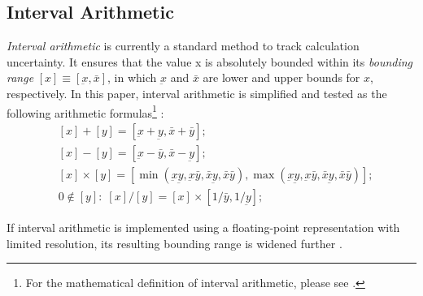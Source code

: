 \documentclass[twoside]{article}
\numberwithin{equation}{section}
\begin{document}
\subsection{Interval Arithmetic \cite{Prev_Precision_Arithmetic}}

\emph{Interval arithmetic} \cite{Precise_Numerical_Methods}\cite{Interval_Analysis}\cite{Worst_Case_Error_Bounds}\cite{Interval_Analysis_Theory_Applications}\cite{Interval_Arithmetic}\cite{Interval_Analysis_Notations} is currently a standard method to track calculation uncertainty.  
It ensures that the value x is absolutely bounded within its \emph{bounding range} $[x] \equiv [\underbar{x}, \bar{x}]$, in which $\underbar{x}$ and $\bar{x}$ are lower and upper bounds for $x$, respectively. 
In this paper, interval arithmetic is simplified and tested as the following arithmetic formulas\footnote{For the mathematical definition of interval arithmetic, please see \cite{Interval_Analysis_Notations}.} \cite{Interval_Analysis_Theory_Applications}:
\begin{align}
\label{eqn: interval +} & 
\left[x\right] + \left[y\right] = \left[\underbar{x} + \underbar{y}, \bar{x} + \bar{y}\right]; \\
\label{eqn: interval -} & 
\left[x\right] - \left[y\right] = \left[\underbar{x} - \bar{y}, \bar{x} - \underbar{y}\right]; \\
\label{eqn: interval *} &
\left[x\right] \times \left[y\right] = \left[\min(\underbar{x}  \underbar{y}, \underbar{x}  \bar{y}, \bar{x}  \underbar{y}, \bar{x}  \bar{y}), \max(\underbar{x}  \underbar{y}, \underbar{x}  \bar{y}, \bar{x}  \underbar{y}, \bar{x}  \bar{y})\right]; \\
\label{eqn: interval /} & 0 \notin \left[y\right]: \;
\left[x\right] / \left[y\right] = \left[x\right] \times \left[1/\bar{y}, 1/\underbar{y}\right];
\end{align}

If interval arithmetic is implemented using a floating-point representation with limited resolution, its resulting bounding range is widened further \cite{Worst_Case_Error_Bounds}.
\end{document}
